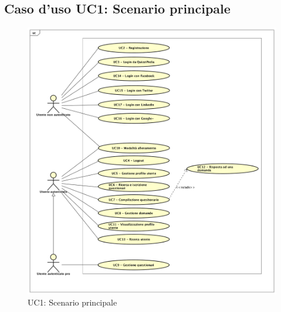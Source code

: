 \newpage
\subsection{Caso d'uso UC1: Scenario principale}

\label{UC1}
\begin{figure}
	\centering
	\includegraphics[scale=0.45]{UML/UC1.png}
	\caption{UC1: Scenario principale}
\end{figure}

